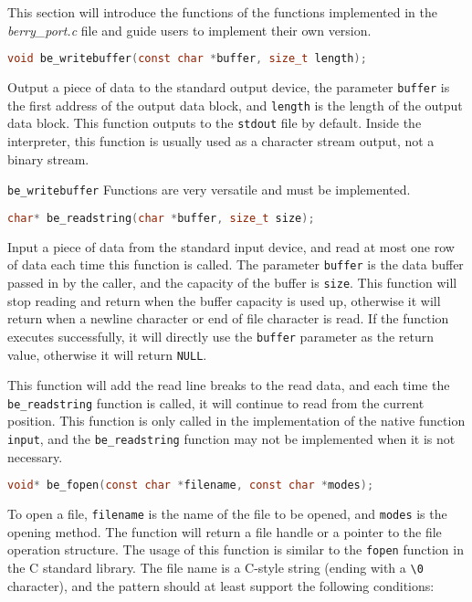 This section will introduce the functions of the functions implemented in the \textsl{berry\_port.c} file and guide users to implement their own version.


\begin{lstlisting}[language=c, numbers=none]
void be_writebuffer(const char *buffer, size_t length);
\end{lstlisting}

Output a piece of data to the standard output device, the parameter \texttt{buffer} is the first address of the output data block, and \texttt{length} is the length of the output data block. This function outputs to the \texttt{stdout} file by default. Inside the interpreter, this function is usually used as a character stream output, not a binary stream.

\texttt{be\_writebuffer} Functions are very versatile and must be implemented.

\begin{lstlisting}[language=c, numbers=none]
char* be_readstring(char *buffer, size_t size);
\end{lstlisting}

Input a piece of data from the standard input device, and read at most one row of data each time this function is called. The parameter \texttt{buffer} is the data buffer passed in by the caller, and the capacity of the buffer is \texttt{size}. This function will stop reading and return when the buffer capacity is used up, otherwise it will return when a newline character or end of file character is read. If the function executes successfully, it will directly use the \texttt{buffer} parameter as the return value, otherwise it will return \texttt{NULL}.

This function will add the read line breaks to the read data, and each time the \texttt{be\_readstring} function is called, it will continue to read from the current position. This function is only called in the implementation of the native function \texttt{input}, and the \texttt{be\_readstring} function may not be implemented when it is not necessary.


\begin{lstlisting}[language=c, numbers=none]
void* be_fopen(const char *filename, const char *modes);
\end{lstlisting}

To open a file, \texttt{filename} is the name of the file to be opened, and \texttt{modes} is the opening method. The function will return a file handle or a pointer to the file operation structure. The usage of this function is similar to the \texttt{fopen} function in the C standard library. The file name is a C-style string (ending with a \texttt{\textbackslash 0} character), and the pattern should at least support the following conditions:

